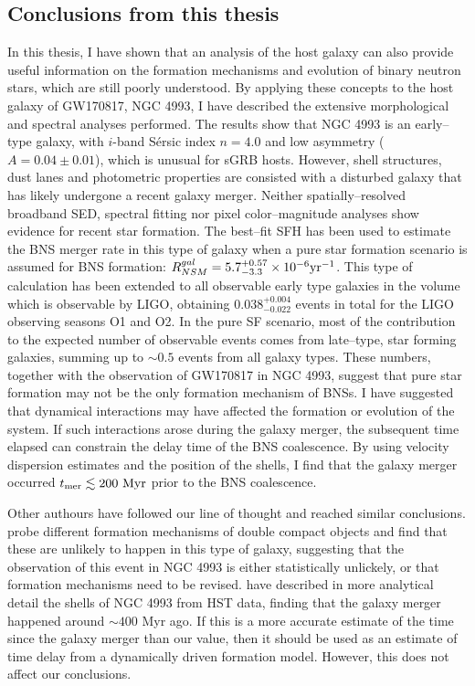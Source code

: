 \subsection{Conclusions from this thesis}
In this thesis, I have shown that an analysis of the host galaxy can also provide useful information on the formation mechanisms and evolution of binary neutron stars, which are still poorly understood. By applying these concepts to the host galaxy of GW170817, NGC 4993, I have described the extensive morphological and spectral analyses performed. The results show that NGC 4993 is an early--type galaxy, with $i$-band S\'ersic index $n=4.0$ and low asymmetry ($A=0.04\pm 0.01$), which is unusual for sGRB hosts. However, shell structures, dust lanes and photometric properties are consisted with a disturbed galaxy that has likely undergone a recent galaxy merger. Neither spatially--resolved broadband SED, spectral fitting nor pixel color--magnitude analyses show evidence for recent star formation. The best--fit SFH has been used to estimate the BNS merger rate in this type of galaxy when a pure star formation scenario is assumed for BNS formation: $R_{NSM}^{gal}= 5.7^{+0.57}_{-3.3} \times 10^{-6} {\rm yr}^{-1}$. This type of calculation has been extended to all observable early type galaxies in the volume which is observable by LIGO, obtaining $0.038^{+0.004}_{-0.022}$ events in total for the LIGO observing seasons O1 and O2. In the pure SF scenario, most of the contribution to the expected number of observable events comes from late--type, star forming galaxies, summing up to $\sim 0.5$ events from all galaxy types. These numbers, together with the observation of GW170817 in NGC 4993, suggest that pure star formation may not be the only formation mechanism of BNSs. I have suggested that dynamical interactions may have affected the formation or evolution of the system. If such interactions arose during the galaxy merger, the subsequent time elapsed can constrain the delay time of the BNS coalescence. By using velocity dispersion estimates and the position of the shells, I find that the galaxy merger occurred $t_{\rm mer}\lesssim 200~{\rm Myr}$ prior to the BNS coalescence. 

Other authours have followed our line of thought and reached similar conclusions. \citet{Belczynski} probe different formation mechanisms of double compact objects and find that these are unlikely to happen in this type of galaxy, suggesting that the observation of this event in NGC 4993 is either statistically unlickely, or that formation mechanisms need to be revised. \citet{ebrova} have described in more analytical detail the shells of NGC 4993 from HST data, finding that the galaxy merger happened around $\sim 400$ Myr ago. If this is a more accurate estimate of the time since the galaxy merger than our value, then it should be used as an estimate of time delay from a dynamically driven formation model. However, this does not affect our conclusions.

